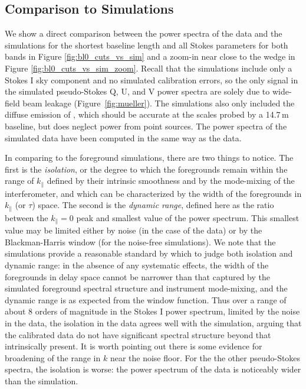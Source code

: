 \documentclass[twocolumn, trackchanges]{aastex61}
\begin{document}
{\subsection{Comparison to Simulations}

We show a direct comparison between the power spectra of the data and the simulations for the shortest baseline length and all Stokes parameters for both bands in Figure \ref{fig:bl0_cuts_vs_sim} and a zoom-in near close to the wedge in Figure \ref{fig:bl0_cuts_vs_sim_zoom}.  Recall that the simulations include only a Stokes I sky component and no simulated calibration errors, so the only signal in the simulated pseudo-Stokes Q, U, and V power spectra are solely due to wide-field beam leakage (Figure~\ref{fig:mueller}).   The simulations also only included the diffuse emission of \citep[the most recent version of the GSM;][]{GSM.17}, which should be accurate at the scales probed by a 14.7\,m baseline, but does neglect power from point sources.  The power spectra of the simulated data have been computed in the same way as the data.  

In comparing to the foreground simulations, there are two things to notice.  The first is the {\it isolation}, or the degree to which the foregrounds remain within the range of $k_\parallel$ defined by their intrinsic smoothness and by the mode-mixing of the interferometer, and which can be characterized by the width of the foregrounds in $k_\parallel$ (or $\tau$) space.  The second is the {\it dynamic range}, defined here as the ratio between the $k_\parallel=0$ peak and smallest value of the power spectrum.  This smallest value may be limited either by noise (in the case of the data) or by the Blackman-Harris window (for the noise-free simulations).  We note that the simulations provide a reasonable standard by which to judge both isolation and dynamic range: in the absence of any systematic effects, the width of the foregrounds in delay space cannot be narrower than that captured by the simulated foreground spectral structure and instrument mode-mixing, and the dynamic range is as expected from the window function.  Thus over a range of about 8 orders of magnitude in the Stokes I power spectrum, limited by the noise in the data, the isolation in the data agrees well with the simulation, arguing that the calibrated data do not have significant spectral structure beyond that intrinsically present.   It is worth pointing out there is some evidence for broadening of the range in $k$ near the noise floor.  For the the other pseudo-Stokes spectra, the isolation is worse: the power spectrum of the data is noticeably wider than the simulation.  

}
\end{document}
